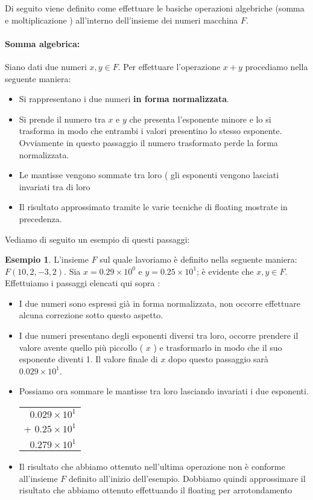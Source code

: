 \documentclass[12pt, a4paper]{book}
\theoremstyle{definition}
\newtheorem{exmp}{Esempio}[section]
\begin{document}
\begin{flushleft}


Di seguito viene definito come effettuare le basiche operazioni algebriche (somma e moltiplicazione ) all'interno dell'insieme dei numeri macchina $F$.

\paragraph{Somma algebrica: } Siano dati due numeri $x, y \in F$.  Per effettuare l'operazione $x + y$ procediamo nella seguente maniera: \\
\begin{itemize}
	\item  Si rappresentano i due numeri \textbf{in forma normalizzata}. 
	\item  Si prende il numero tra $x$ e $y$ che presenta l'esponente minore e lo si trasforma in modo che entrambi i valori presentino lo stesso esponente.  Ovviamente in questo passaggio il numero trasformato perde la forma normalizzata. 
	\item  Le mantisse vengono sommate tra loro ( gli esponenti vengono lasciati invariati tra di loro 
	\item  Il risultato approssimato tramite le varie tecniche di floating mostrate in precedenza. 
\end{itemize}

Vediamo di seguito un esempio di questi passaggi: 

\begin{exmp}
L'insieme $F$ sul quale lavoriamo è definito nella seguente maniera: $F(10, 2, -3,2)$.  Sia $x = 0.29 \times 10^{0}$  e $ y = 0.25 \times 10^{1}$; è evidente che $x,y \in F$.  
Effettuiamo i passaggi elencati qui sopra : 
\begin{itemize}
	\item I due numeri sono espressi già in forma normalizzata, non occorre effettuare alcuna correzione sotto questo aspetto.
	\item I due numeri presentano degli esponenti diversi tra loro, occorre prendere il valore avente quello più piccollo ( $x$ ) e trasformarlo in modo che il suo esponente diventi 1. Il valore finale di $x$ dopo questo passaggio sarà $0.029 \times 10^{1}$.  
	\item Possiamo ora sommare le mantisse tra loro lasciando invariati i due esponenti. \\
	\vspace{1em}
	 \begin{tabular}{r}
    $0.029 \times 10^{1}$ \\ 
    + $0.25 \times 10^{1}$  \\ 
     \hline
     $0.279 \times 10^{1}$
 \end{tabular}
 	\item Il risultato che abbiamo ottenuto nell'ultima operazione non è conforme all'insieme $F$ definito all'inizio dell'esempio. Dobbiamo quindi approssimare il risultato che abbiamo ottenuto effettuando il floating per arrotondamento 
 	

\end{itemize}
\end{exmp}
\end{flushleft}
\end{document}
